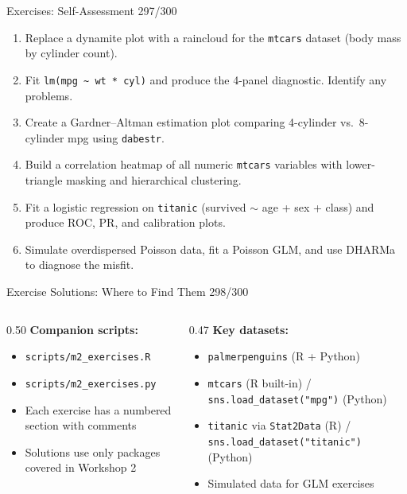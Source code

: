 \documentclass[10pt]{beamer}
\newcommand{\smark}[1]{\hfill{\scriptsize\color{codegray}#1}}
\begin{document}
\begin{frame}{Exercises: Self-Assessment}
\smark{297/300}
\begin{enumerate}
    \item Replace a dynamite plot with a raincloud for the \texttt{mtcars} dataset (body mass by cylinder count).
    \item Fit \texttt{lm(mpg \textasciitilde\ wt * cyl)} and produce the 4-panel diagnostic. Identify any problems.
    \item Create a Gardner--Altman estimation plot comparing 4-cylinder vs.\ 8-cylinder mpg using \texttt{dabestr}.
    \item Build a correlation heatmap of all numeric \texttt{mtcars} variables with lower-triangle masking and hierarchical clustering.
    \item Fit a logistic regression on \texttt{titanic} (survived $\sim$ age + sex + class) and produce ROC, PR, and calibration plots.
    \item Simulate overdispersed Poisson data, fit a Poisson GLM, and use DHARMa to diagnose the misfit.
\end{enumerate}
\end{frame}

\begin{frame}{Exercise Solutions: Where to Find Them}
\smark{298/300}
\begin{columns}[T]
\begin{column}{0.50\textwidth}
    \textbf{Companion scripts:}
    \begin{itemize}
        \item \texttt{scripts/m2\_exercises.R}
        \item \texttt{scripts/m2\_exercises.py}
        \item Each exercise has a numbered section with comments
        \item Solutions use only packages covered in Workshop 2
    \end{itemize}
\end{column}
\begin{column}{0.47\textwidth}
    \textbf{Key datasets:}
    \begin{itemize}
        \item \texttt{palmerpenguins} (R + Python)
        \item \texttt{mtcars} (R built-in) / \texttt{sns.load\_dataset("mpg")} (Python)
        \item \texttt{titanic} via \texttt{Stat2Data} (R) / \texttt{sns.load\_dataset("titanic")} (Python)
        \item Simulated data for GLM exercises
    \end{itemize}
\end{column}
\end{columns}
\end{frame}
\end{document}
